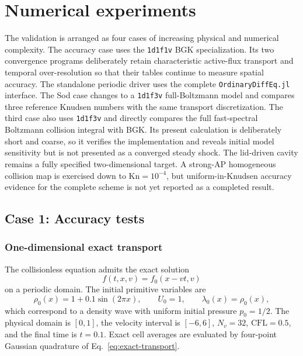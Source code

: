 \documentclass[preprint,3p,12pt]{elsarticle}
\newcommand{\cfl}{\mathrm{CFL}}
\begin{document}
\section{Numerical experiments}
\label{sec:numerical}

The validation is arranged as four cases of increasing physical and numerical complexity. The accuracy case uses the \texttt{1d1f1v} BGK specialization. Its two convergence programs deliberately retain characteristic active-flux transport and temporal over-resolution so that their tables continue to measure spatial accuracy. The standalone periodic driver uses the complete \texttt{OrdinaryDiffEq.jl} interface. The Sod case changes to a \texttt{1d1f3v} full-Boltzmann model and compares three reference Knudsen numbers with the same transport discretization. The third case also uses \texttt{1d1f3v} and directly compares the full fast-spectral Boltzmann collision integral with BGK. Its present calculation is deliberately short and coarse, so it verifies the implementation and reveals initial model sensitivity but is not presented as a converged steady shock. The lid-driven cavity remains a fully specified two-dimensional target. A strong-AP homogeneous collision map is exercised down to $\mathrm{Kn}=10^{-4}$, but uniform-in-Knudsen accuracy evidence for the complete scheme is not yet reported as a completed result.

\subsection{Case 1: Accuracy tests}
\label{sec:accuracy}

\subsubsection{One-dimensional exact transport}

The collisionless equation admits the exact solution
\begin{equation}
  f(t,x,v)=f_0(x-vt,v)
  \label{eq:exact-transport}
\end{equation}
on a periodic domain. The initial primitive variables are
\begin{equation}
  \rho_0(x)=1+0.1\sin(2\pi x),
  \qquad U_0=1,
  \qquad \lambda_0(x)=\rho_0(x),
  \label{eq:wave-initial}
\end{equation}
which correspond to a density wave with uniform initial pressure $p_0=1/2$. The physical domain is $[0,1]$, the velocity interval is $[-6,6]$, $N_v=32$, $\cfl=0.5$, and the final time is $t=0.1$. Exact cell averages are evaluated by four-point Gaussian quadrature of Eq.~\eqref{eq:exact-transport}.
\end{document}
